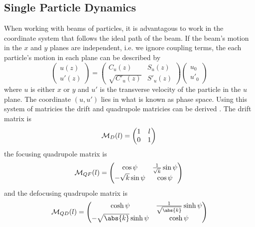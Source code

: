 \subsection{Single Particle Dynamics}

When working with beams of particles, it is advantagous to work in the
coordinate system that follows the ideal path of the beam. If the beam's motion
in the \(x\) and \(y\) planes are independent, i.e. we ignore coupling terms,
the each particle's motion in each plane can be described by
\begin{equation}
	\begin{pmatrix}
		u(z) \\ u'(z)
	\end{pmatrix}
	=
	\begin{pmatrix}
		C_u(z)  & S_u(z)  \\
		\sqrt{C'_u(z)} & S'_u(z)
	\end{pmatrix}
	\begin{pmatrix}
		u_0 \\ u'_0
	\end{pmatrix}
\end{equation}
where \(u\) is either \(x\) or \(y\) and \(u'\) is the transverse velocity of
the particle in the \(u\) plane. The coordinate \((u, u')\) lies in what is
known as phase space. Using this system of matricies the drift and quadrupole
matricies can be derived \cite{wiedemann2007particle}. The drift matrix is
\begin{equation}
	\mathcal{M}_D(l) =
	\begin{pmatrix}
		1 & l \\
		0 & 1
	\end{pmatrix} \\
\end{equation}
the focusing quadrupole matrix is
\begin{equation}
	\mathcal{M}_{QF}(l) =
	\begin{pmatrix}
		\cos\psi & \frac{1}{\sqrt{k}}\sin\psi \\
		-\sqrt{k}\sin\psi & \cos\psi
	\end{pmatrix} \\
\end{equation}
and the defocusing quadrupole matrix is
\begin{equation}
	\mathcal{M}_{QD}(l) =
	\begin{pmatrix}
		\cosh\psi & \frac{1}{\sqrt{\abs{k}}}\sinh\psi \\
		-\sqrt{\abs{k}}\sinh\psi & \cosh\psi
	\end{pmatrix}
\end{equation}

